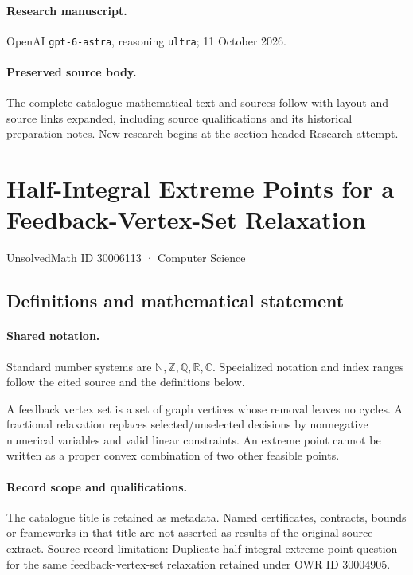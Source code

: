 \documentclass[11pt]{article}
\begin{document}
\paragraph{Research manuscript.} OpenAI \texttt{gpt-6-astra}, reasoning \texttt{ultra}; 11 October 2026.
\paragraph{Preserved source body.} The complete catalogue mathematical text and sources follow with layout and source links expanded, including source qualifications and its historical preparation notes. New research begins at the section headed Research attempt.

\section{Half-Integral Extreme Points for a Feedback-Vertex-Set Relaxation}\label{30006113}
{\small UnsolvedMath ID 30006113 · Computer Science}
\subsection{Definitions and mathematical statement}

\paragraph{Shared notation.}Standard number systems are $\mathbb N,\mathbb Z,\mathbb Q,\mathbb R,\mathbb C$. Specialized notation and index ranges follow the cited source and the definitions below.


A feedback vertex set is a set of graph vertices whose removal leaves no cycles. A fractional relaxation replaces selected/unselected decisions by nonnegative numerical variables and valid linear constraints. An extreme point cannot be written as a proper convex combination of two other feasible points.
\paragraph{Record scope and qualifications.}
The catalogue title is retained as metadata. Named certificates, contracts, bounds or frameworks in that title are not asserted as results of the original source extract.
Source-record limitation: Duplicate half-integral extreme-point question for the same feedback-vertex-set relaxation retained under OWR ID 30004905.
\end{document}
